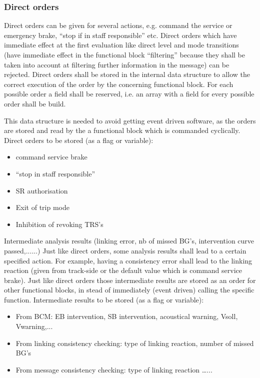 \subsubsection{Direct orders}
Direct orders can be given for several actions, e.g. command the service or emergency brake, “stop if in staff responsible” etc. Direct orders which have immediate effect at the first evaluation like direct level and mode transitions (have immediate effect in the functional block “filtering” because they shall be taken into account at filtering further information in the message) can be rejected. 
Direct orders shall be stored in the internal data structure to allow the correct execution of the order by the concerning functional block. For each possible order a field shall be reserved, i.e. an array with a field for every possible order shall be build.

This data structure is needed to avoid getting event driven software, as the orders are stored and read by the a functional block which is commanded cyclically.
Direct orders to be stored (as a flag or variable):
\begin{itemize}
\item command service brake
\item “stop in staff responsible”
\item SR authorisation
\item Exit of trip mode
\item Inhibition of revoking TRS's
\end{itemize}


Intermediate analysis results (linking error, nb of missed BG's, intervention curve passed,......)
Just like direct orders, some analysis results shall lead to a certain specified action. For example, having a consistency error shall lead to the linking reaction (given from track-side or the default value which is command service brake). Just like direct orders those intermediate results are stored as an order for other functional blocks, in stead of immediately (event driven) calling the specific function.
Intermediate results to be stored (as a flag or variable):
\begin{itemize}
\item From BCM: EB intervention, SB intervention, acoustical warning, Vsoll, Vwarning,...
\item From linking consistency checking: type of linking reaction, number of missed BG's
\item From message consistency checking: type of linking reaction
…...
\end{itemize}

